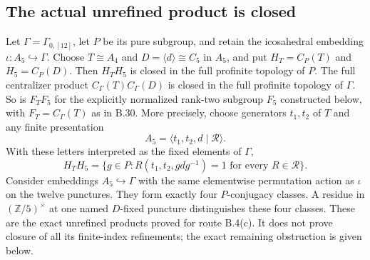 \subsection*{The actual unrefined product is closed}

Let $\Gamma=\Gamma_{0,[12]}$, let $P$ be its pure subgroup,
and retain the icosahedral embedding $\iota:A_5\hookrightarrow\Gamma$.
Choose $T\cong A_4$ and $D=\langle d\rangle\cong C_5$ in $A_5$,
and put $H_T=C_P(T)$ and $H_5=C_P(D)$.
Then $H_TH_5$ is closed in the full profinite topology of $P$.
The full centralizer product $C_\Gamma(T)C_\Gamma(D)$ is
closed in the full profinite topology of $\Gamma$.
So is $F_TF_5$ for the explicitly normalized rank-two
subgroup $F_5$ constructed below, with
$F_T=C_\Gamma(T)$ as in B.30.
More precisely, choose generators $t_1,t_2$ of $T$ and any
finite presentation
\[
 A_5=\langle t_1,t_2,d\mid\mathcal R\rangle.
\]
With these letters interpreted as the fixed elements of $\Gamma$,
\[
 H_TH_5
 =\{g\in P:R(t_1,t_2,gdg^{-1})=1
                    \text{ for every }R\in\mathcal R\}.
 \tag{B.52.1}
\]
Consider embeddings $A_5\hookrightarrow\Gamma$ with the
same elementwise permutation action as $\iota$ on the twelve
punctures.  They form exactly four $P$-conjugacy classes.
A residue in $(\mathbb Z/5)^\times$ at one named $D$-fixed
puncture distinguishes these four classes.
These are the exact unrefined products proved for route B.4(c).
It does not prove closure of all its finite-index refinements;
the exact remaining obstruction is given below.

